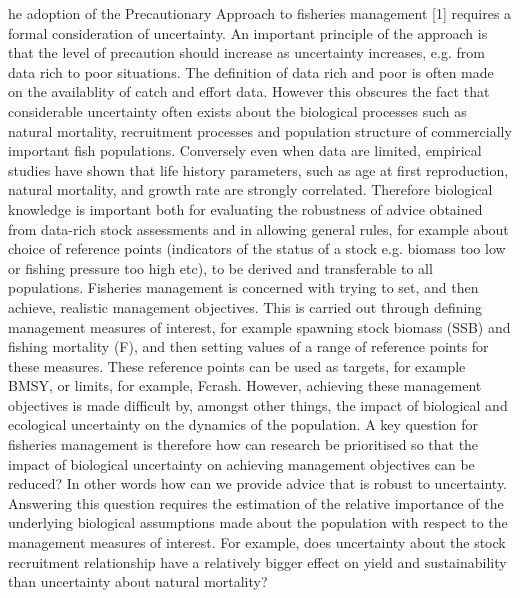 \documentclass{pnastwo}
\begin{document}
\begin{article}
he adoption of the Precautionary Approach to ﬁsheries management [1] requires a formal consideration of uncertainty. An important principle of the approach is that the level of precaution should increase as uncertainty increases, e.g. from data rich to poor situations. The deﬁnition of data rich and poor is often made on the availablity of catch and eﬀort data. However this obscures the fact that considerable uncertainty often exists about the biological processes such as natural mortality, recruitment processes and population structure of commercially important ﬁsh populations. Conversely even when data are limited, empirical studies have shown that life history parameters, such as age at ﬁrst reproduction, natural mortality, and growth rate are strongly correlated. Therefore biological knowledge is important both for evaluating the robustness of advice obtained from data-rich stock assessments and in allowing general rules, for example about choice of reference points (indicators of the status of a stock e.g. biomass too low or ﬁshing pressure too high etc), to be derived and transferable to all populations. 
Fisheries management is concerned with trying to set, and then achieve, realistic management objectives. This is carried out through deﬁning management measures of interest, for example spawning stock biomass (SSB) and ﬁshing mortality (F), and then setting values of a range of reference points for these measures. These reference points can be used as targets, for example BMSY, or limits, for example, Fcrash. However, achieving these management objectives is made difficult by, amongst other things, the impact of biological and ecological uncertainty on the dynamics of the population. 
A key question for ﬁsheries management is therefore how can research be prioritised so that the impact of biological uncertainty on achieving management objectives can be reduced? In other words how can we provide advice that is robust to uncertainty. Answering this question requires the estimation of the relative importance of the underlying biological assumptions made about the population with respect to the management measures of interest. For example, does uncertainty about the stock recruitment relationship have a relatively bigger eﬀect on yield and sustainability than uncertainty about natural mortality? 

\end{article}
\end{document}
